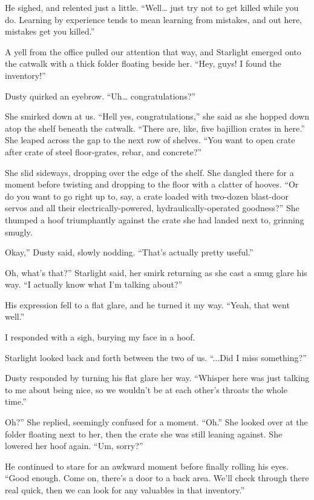 He sighed, and relented just a little. “Well… just try not to get killed while you do. Learning by experience tends to mean learning from mistakes, and out here, mistakes get you killed.”

A yell from the office pulled our attention that way, and Starlight emerged onto the catwalk with a thick folder floating beside her. “Hey, guys! I found the inventory!”

Dusty quirked an eyebrow. “Uh… congratulations?”

She smirked down at us. “Hell yes, congratulations,” she said as she hopped down atop the shelf beneath the catwalk. “There are, like, five bajillion crates in here.” She leaped across the gap to the next row of shelves. “You want to open crate after crate of steel floor-grates, rebar, and concrete?”

She slid sideways, dropping over the edge of the shelf. She dangled there for a moment before twisting and dropping to the floor with a clatter of hooves. “Or do you want to go right up to, say, a crate loaded with two-dozen blast-door servos and all their electrically-powered, hydraulically-operated goodness?” She thumped a hoof triumphantly against the crate she had landed next to, grinning smugly.

\leavevmode{}Okay,” Dusty said, slowly nodding. “That’s actually pretty useful.”

\leavevmode{}Oh, what’s that?” Starlight said, her smirk returning as she cast a smug glare his way. “I actually know what I’m talking about?”

His expression fell to a flat glare, and he turned it my way. “Yeah, that went well.”

I responded with a sigh, burying my face in a hoof.

Starlight looked back and forth between the two of us. “...Did I miss something?”

Dusty responded by turning his flat glare her way. “Whisper here was just talking to me about being nice, so we wouldn’t be at each other’s throats the whole time.”

\leavevmode{}Oh?” She replied, seemingly confused for a moment. “Oh.” She looked over at the folder floating next to her, then the crate she was still leaning against. She lowered her hoof again. “Um, sorry?”

He continued to stare for an awkward moment before finally rolling his eyes. “Good enough. Come on, there’s a door to a back area. We’ll check through there real quick, then we can look for any valuables in that inventory.”

